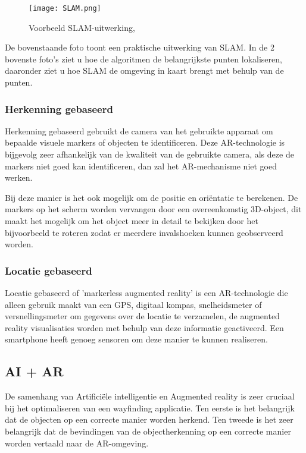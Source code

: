 \begin{figure}[H]
	\centering
	\texttt{[image: SLAM.png]}
	\caption{Voorbeeld SLAM-uitwerking, \autocite{AVRSpot2018}}
\end{figure}

De bovenstaande foto toont een praktische uitwerking van SLAM. In de 2 bovenste foto's ziet u hoe de algoritmen de belangrijkste punten lokaliseren, daaronder ziet u hoe SLAM de omgeving in kaart brengt met behulp van de punten.

\pagebreak
\subsubsection{Herkenning gebaseerd}
Herkenning gebaseerd gebruikt de camera van het gebruikte apparaat om bepaalde visuele markers of objecten te identificeren. Deze AR-technologie is bijgevolg zeer afhankelijk van de kwaliteit van de gebruikte camera, als deze de markers niet goed kan identificeren, dan zal het AR-mechanisme niet goed werken. \autocite{NewGenApps2017}

Bij deze manier is het ook mogelijk om de positie en oriëntatie te berekenen. De markers op het scherm worden vervangen door een overeenkomstig 3D-object, dit maakt het mogelijk om het object meer in detail te bekijken door het bijvoorbeeld te roteren zodat er meerdere invalshoeken kunnen geobserveerd worden.

\subsubsection{Locatie gebaseerd}
Locatie gebaseerd of 'markerless augmented reality' is een AR-technologie die alleen gebruik maakt van een GPS, digitaal kompas, snelheidsmeter of versnellingsmeter om gegevens over de locatie te verzamelen, de augmented reality visualisaties worden met behulp van deze informatie geactiveerd. Een smartphone heeft genoeg sensoren om deze manier te kunnen realiseren. \autocite{NewGenApps2017}

\subsection{AI + AR}
De samenhang van Artificiële intelligentie en Augmented reality is zeer cruciaal bij het optimaliseren van een wayfinding applicatie. Ten eerste is het belangrijk dat de objecten op een correcte manier worden herkend. Ten tweede is het zeer belangrijk dat de bevindingen van de objectherkenning op een correcte manier worden vertaald naar de AR-omgeving. 
\newpage
